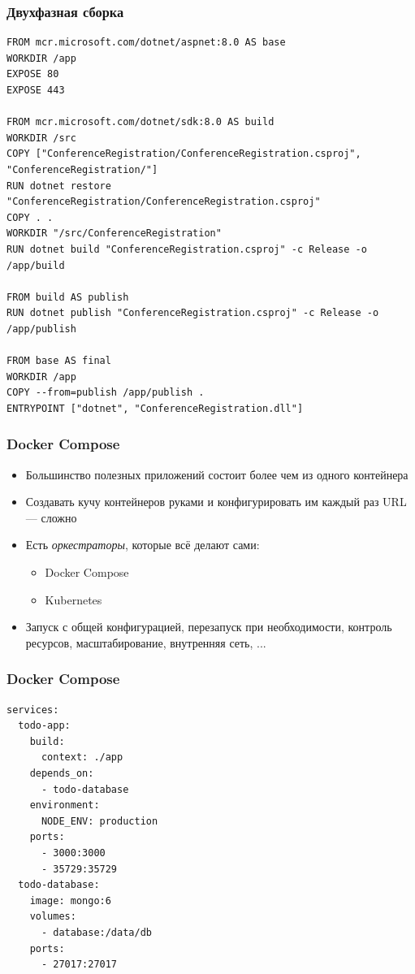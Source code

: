\documentclass{../../slides-style}
\begin{document}
    \begin{frame}[fragile]
        \frametitle{Двухфазная сборка}
        \begin{scriptsize}
            \begin{verbatim}
FROM mcr.microsoft.com/dotnet/aspnet:8.0 AS base
WORKDIR /app
EXPOSE 80
EXPOSE 443

FROM mcr.microsoft.com/dotnet/sdk:8.0 AS build
WORKDIR /src
COPY ["ConferenceRegistration/ConferenceRegistration.csproj", "ConferenceRegistration/"]
RUN dotnet restore "ConferenceRegistration/ConferenceRegistration.csproj"
COPY . .
WORKDIR "/src/ConferenceRegistration"
RUN dotnet build "ConferenceRegistration.csproj" -c Release -o /app/build

FROM build AS publish
RUN dotnet publish "ConferenceRegistration.csproj" -c Release -o /app/publish

FROM base AS final
WORKDIR /app
COPY --from=publish /app/publish .
ENTRYPOINT ["dotnet", "ConferenceRegistration.dll"]
            \end{verbatim}
        \end{scriptsize}
    \end{frame}

    \begin{frame}
        \frametitle{Docker Compose}
        \begin{itemize}
            \item Большинство полезных приложений состоит более чем из одного контейнера
            \item Создавать кучу контейнеров руками и конфигурировать им каждый раз URL --- сложно
            \item Есть \emph{оркестраторы}, которые всё делают сами:
            \begin{itemize}
                \item Docker Compose
                \item Kubernetes
            \end{itemize}
            \item Запуск с общей конфигурацией, перезапуск при необходимости, контроль ресурсов, масштабирование, внутренняя сеть, ...
        \end{itemize}
    \end{frame}

    \begin{frame}[fragile]
        \frametitle{Docker Compose}
        \begin{scriptsize}
            \begin{verbatim}
services:
  todo-app:
    build:
      context: ./app
    depends_on:
      - todo-database
    environment:
      NODE_ENV: production
    ports:
      - 3000:3000
      - 35729:35729
  todo-database:
    image: mongo:6
    volumes: 
      - database:/data/db
    ports:
      - 27017:27017
            \end{verbatim}
        \end{scriptsize}
    \end{frame}
\end{document}
